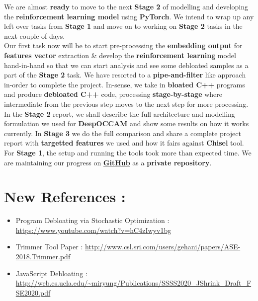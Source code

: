 \documentclass{article} %
\begin{document}
We are almost \textbf{\color{ao(english)}ready} to move to the next \textbf{Stage 2} of modelling and developing the \textbf{\color{ao(english)} reinforcement learning model} using \textbf{PyTorch}. We intend to wrap up any left over tasks from \textbf{Stage 1} and move on to working on \textbf{Stage 2} tasks in the next couple of days. \\ 

Our first task now will be to start pre-processing the \textbf{\color{ao(english)} embedding output} for \textbf{\color{ao(english)} features vector} extraction \& develop the \textbf{\color{ao(english)}reinforcement learning} model hand-in-hand so that we can start analysis and see some debloated samples as a part of the \textbf{Stage 2} task. We have resorted to a \textbf{pipe-and-filter} like approach in-order to complete the project. In-sense, we take in \textbf{\color{red} bloated C++} programs and produce \textbf{\color{ao(english)} debloated C++} code, processing \textbf{stage-by-stage} where intermediate from the previous step moves to the next step for more processing. \\ 

In the \textbf{Stage 2} report, we shall describe the full architecture and modelling formulation we used for \textbf{DeepOCCAM} and show some results on how it works currently. In \textbf{Stage 3} we do the full comparison and share a complete project report with \textbf{targetted features} we used and how it fairs against \textbf{Chisel} tool.  For \textbf{Stage 1}, the setup and running the tools took more than expected time. We are maintaining our progress on \textbf{\href{https://github.com/lahiri-phdworks/reinforcedlearning-debloater} {GitHub}} as a \textbf{private repository}.

\section*{New References : }
\begin{itemize}
	\item Program Debloating via Stochastic Optimization : \url{https://www.youtube.com/watch?v=hC4zIwyv1bg}
	\item Trimmer Tool Paper : \url{http://www.csl.sri.com/users/gehani/papers/ASE-2018.Trimmer.pdf}
	\item JavaScript Debloating : \url{http://web.cs.ucla.edu/~miryung/Publications/SSSS2020_JShrink_Draft_FSE2020.pdf}
\end{itemize}
\end{document}
